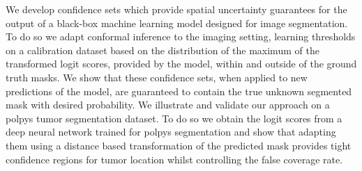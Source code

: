 We develop confidence sets which provide spatial uncertainty guarantees for the output of a black-box machine learning model designed for image segmentation. To do so we adapt conformal inference to the imaging setting, learning thresholds  on a calibration dataset based on the distribution of the maximum of the transformed logit scores, provided by the model, within and outside of the ground truth masks. We show that these confidence sets, when applied to new predictions of the model, are guaranteed to contain the true unknown segmented mask with desired probability. We illustrate and validate our approach on a polpys tumor segmentation dataset. To do so we obtain the logit scores from a deep neural network trained for polpys segmentation and show that adapting them using a distance based transformation of the predicted mask provides tight confidence regions for tumor location whilst controlling the false coverage rate. 